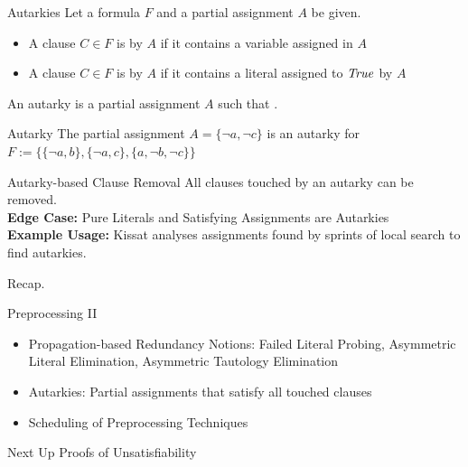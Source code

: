 \documentclass[t]{sdqbeamer}
\begin{document}
\begin{frame}{Autarkies}
Let a formula $F$ and a partial assignment $A$ be given.\\[1ex]
\begin{itemize}\setlength{\itemsep}{1ex}
    \item A clause $C \in F$ is  by $A$ if it contains a variable assigned in $A$
    \item A clause $C \in F$ is  by $A$ if it contains a literal assigned to $\mathit{True}$ by $A$
\end{itemize}
An autarky is a partial assignment $A$ such that .
\begin{exampleblock}{Autarky}
The partial assignment $A = \{ \lnot a, \lnot c \}$ is an autarky for $F := \bigl\{\{ \lnot a, b \}, \{ \lnot a, c \}, \{ a, \lnot b, \lnot c \}\bigr\}$
\end{exampleblock}
\begin{block}{Autarky-based Clause Removal}
All clauses touched by an autarky can be removed.\\[1ex]
\textbf{Edge Case:} Pure Literals and Satisfying Assignments are Autarkies\\[1ex]
\textbf{Example Usage:} Kissat analyses assignments found by sprints of local search to find autarkies.
\end{block}
\end{frame}


\begin{frame}{Recap.}
\begin{block}{Preprocessing II}
    \begin{itemize}\setlength{\itemsep}{1em}
        \item Propagation-based Redundancy Notions: Failed Literal Probing, Asymmetric Literal Elimination, Asymmetric Tautology Elimination
        \item Autarkies: Partial assignments that satisfy all touched clauses
        \item Scheduling of Preprocessing Techniques
    \end{itemize}
\end{block}
\begin{block}{Next Up}
    Proofs of Unsatisfiability
\end{block}
\end{frame}
\end{document}
